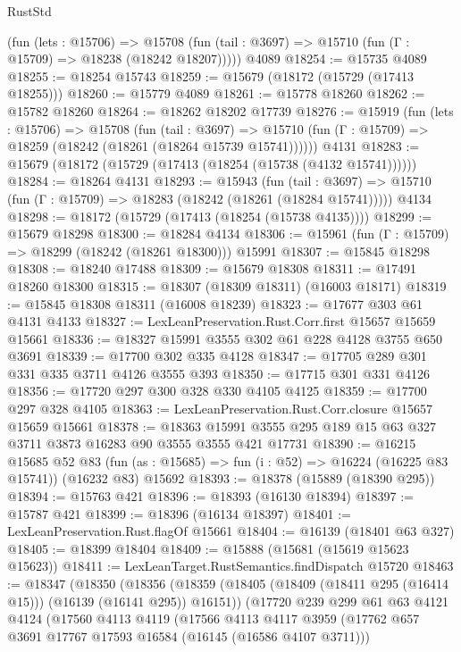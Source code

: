 \begin{lexlean}{RustStd}
\begin{coremodule}
{\begin{coremodule}
{{{{{{{{{{{{{{{{{{{{{{{{{{{{{{{{{{{{{{{{{{{{{{{      (fun (lets : @15706) =>
      @15708 (fun (tail : @3697) => @15710 (fun (Γ : @15709) => @18238 (@18242 @18207)))))
    @4089
@18254 := @15735 @4089
@18255 := @18254 @15743
@18259 := @15679 (@18172 (@15729 (@17413 @18255)))
@18260 := @15779 @4089
@18261 := @15778 @18260
@18262 := @15782 @18260
@18264 := @18262 @18202 @17739
@18276 := @15919
    (fun (lets : @15706) =>
    @15708
      (fun (tail : @3697) =>
      @15710 (fun (Γ : @15709) => @18259 (@18242 (@18261 (@18264 @15739 @15741))))))
    @4131
@18283 := @15679 (@18172 (@15729 (@17413 (@18254 (@15738 (@4132 @15741))))))
@18284 := @18264 @4131
@18293 := @15943
    (fun (tail : @3697) => @15710 (fun (Γ : @15709) => @18283 (@18242 (@18261 (@18284 @15741)))))
    @4134
@18298 := @18172 (@15729 (@17413 (@18254 (@15738 @4135))))
@18299 := @15679 @18298
@18300 := @18284 @4134
@18306 := @15961 (fun (Γ : @15709) => @18299 (@18242 (@18261 @18300))) @15991
@18307 := @15845 @18298
@18308 := @18240 @17488
@18309 := @15679 @18308
@18311 := @17491 @18260 @18300
@18315 := @18307 (@18309 @18311) (@16003 @18171)
@18319 := @15845 @18308 @18311 (@16008 @18239)
@18323 := @17677 @303 @61 @4131 @4133
@18327 := LexLeanPreservation.Rust.Corr.first @15657 @15659 @15661
@18336 := @18327 @15991 @3555 @302 @61 @228 @4128 @3755 @650 @3691
@18339 := @17700 @302 @335 @4128
@18347 := @17705 @289 @301 @331 @335 @3711 @4126 @3555 @393
@18350 := @17715 @301 @331 @4126
@18356 := @17720 @297 @300 @328 @330 @4105 @4125
@18359 := @17700 @297 @328 @4105
@18363 := LexLeanPreservation.Rust.Corr.closure @15657 @15659 @15661
@18378 := @18363 @15991 @3555 @295 @189 @15 @63 @327 @3711 @3873 @16283 @90 @3555 @3555 @421 @17731
@18390 := @16215
    @15685
    @52
    @83
    (fun (as : @15685) => fun (i : @52) => @16224 (@16225 @83 @15741))
    (@16232 @83)
    @15692
@18393 := @18378 (@15889 (@18390 @295))
@18394 := @15763 @421
@18396 := @18393 (@16130 @18394)
@18397 := @15787 @421
@18399 := @18396 (@16134 @18397)
@18401 := LexLeanPreservation.Rust.flagOf @15661
@18404 := @16139 (@18401 @63 @327)
@18405 := @18399 @18404
@18409 := @15888 (@15681 (@15619 @15623 @15623))
@18411 := LexLeanTarget.RustSemantics.findDispatch @15720
@18463 := @18347
    (@18350
      (@18356
        (@18359 (@18405 (@18409 (@18411 @295 (@16414 @15))) (@16139 (@16141 @295)) @16151))
        (@17720
          @239
          @299
          @61
          @63
          @4121
          @4124
          (@17560
            @4113
            @4119
            (@17566
              @4113
              @4117
              @3959
              (@17762 @657 @3691 @17767 @17593 @16584 (@16145 (@16586 @4107 @3711)))
}}}}}}}}}}}}}}}}}}}}}}}}}}}}}}}}}}}}}}}}}}}}}}}
\end{coremodule}}
\end{coremodule}
\end{lexlean}
